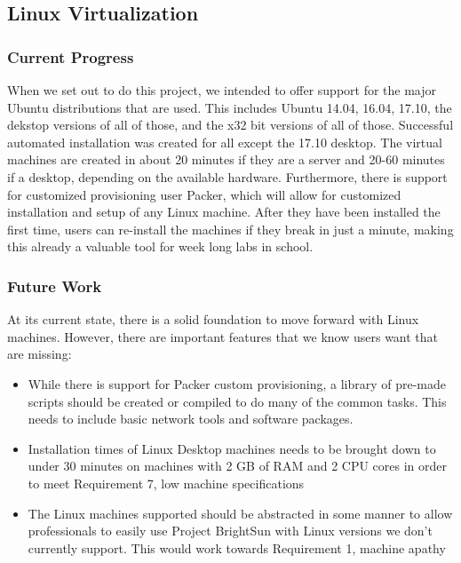 \documentclass[openright]{report}
\begin{document}
\subsection{Linux Virtualization}

\subsubsection{Current Progress}

\par When we set out to do this project, we intended to offer support for the major Ubuntu distributions that are used. This includes Ubuntu 14.04, 16.04, 17.10, the dekstop versions of all of those, and the x32 bit versions of all of those. Successful automated installation was created for all except the 17.10 desktop. The virtual machines are created in about 20 minutes if they are a server and 20-60 minutes if a desktop, depending on the available hardware. Furthermore, there is support for customized provisioning user Packer, which will allow for customized installation and setup of any Linux machine. After they have been installed the first time, users can re-install the machines if they break in just a minute, making this already a valuable tool for week long labs in school.

\subsubsection{Future Work}

\par At its current state, there is a solid foundation to move forward with Linux machines. However, there are important features that we know users want that are missing:

\begin{itemize}
    \item While there is support for Packer custom provisioning, a library of pre-made scripts should be created or compiled to do many of the common tasks. This needs to include basic network tools and software packages.
    \item Installation times of Linux Desktop machines needs to be brought down to under 30 minutes on machines with 2 GB of RAM and 2 CPU cores in order to meet Requirement 7, low machine specifications
    \item The Linux machines supported should be abstracted in some manner to allow professionals to easily use Project BrightSun with Linux versions we don't currently support. This would work towards Requirement 1, machine apathy
\end{itemize}
\end{document}
